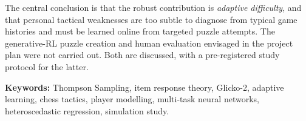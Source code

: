 The central conclusion is that the robust contribution is \emph{adaptive difficulty}, and that
personal tactical weaknesses are too subtle to diagnose from typical game histories and must be
learned online from targeted puzzle attempts. The generative-RL puzzle creation and human
evaluation envisaged in the project plan were not carried out. Both are discussed, with a
pre-registered study protocol for the latter.

\vspace{4mm}
\noindent\textbf{Keywords:} Thompson Sampling, item response theory, Glicko-2, adaptive learning,
chess tactics, player modelling, multi-task neural networks, heteroscedastic regression, simulation study.
